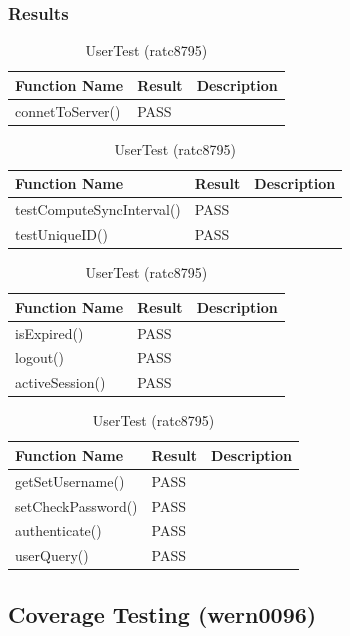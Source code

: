 \documentclass[twoside,letterpaper]{article}
\begin{document}
\subsubsection{Results}

\begin{table}[h]
	\centering
	\caption{MobWriteServerTest (ratc8795)}
	\begin{tabular}{|p{3cm}|p{3cm}|p{9cm}|}
		\hline
		\textbf{Function Name} & \textbf{Result} & \textbf{Description}  \\\hline
		connetToServer() & PASS & \\\hline
	\end{tabular}
	
	\centering
	\caption{MobWriteClientTest (ratc8795)}
	\begin{tabular}{|p{6cm}|p{3cm}|p{6cm}|}
		\hline
		\textbf{Function Name} & \textbf{Result} & \textbf{Description}  \\\hline
		testComputeSyncInterval() & PASS & \\\hline
		testUniqueID() & PASS & \\\hline
	\end{tabular}
	
	\centering
	\caption{SessionTest (ratc8795)}
	\begin{tabular}{|p{3cm}|p{3cm}|p{9cm}|}
		\hline
		\textbf{Function Name} & \textbf{Result} & \textbf{Description}  \\\hline
		isExpired() & PASS & \\\hline
		logout() & PASS & \\\hline
		activeSession() & PASS & \\\hline
	\end{tabular}

	\centering
	\caption{UserTest (ratc8795)}
	\begin{tabular}{|p{3cm}|p{3cm}|p{9cm}|}
		\hline
		\textbf{Function Name} & \textbf{Result} & \textbf{Description}  \\\hline
		getSetUsername() & PASS & \\\hline
		setCheckPassword() & PASS & \\\hline
		authenticate() & PASS & \\\hline
		userQuery() & PASS & \\\hline
	\end{tabular}
\end{table}

\clearpage
\subsection{Coverage Testing (wern0096)}
\end{document}

